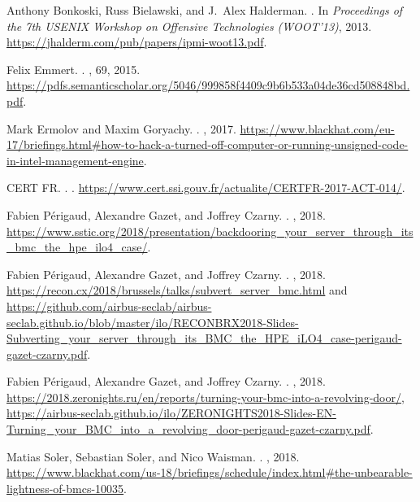 \begin{thebibliography}{1}

Anthony Bonkoski, Russ Bielawski, and J.~Alex Halderman.
.
\newblock In {\em {Proceedings of the 7th USENIX Workshop on Offensive
  Technologies (WOOT'13)}}, 2013.
\newblock \url{https://jhalderm.com/pub/papers/ipmi-woot13.pdf}.

Felix Emmert.
.
, 69, 2015.
\newblock
  \url{https://pdfs.semanticscholar.org/5046/999858f4409c9b6b533a04de36cd508848bd.pdf}.

Mark Ermolov and Maxim Goryachy.
.
, 2017.
\newblock
  \url{https://www.blackhat.com/eu-17/briefings.html#how-to-hack-a-turned-off-computer-or-running-unsigned-code-in-intel-management-engine}.

CERT FR.
.
.
\newblock \url{https://www.cert.ssi.gouv.fr/actualite/CERTFR-2017-ACT-014/}.

Fabien P{\'e}rigaud, Alexandre Gazet, and Joffrey Czarny.
.
, 2018.
\newblock
  \url{https://www.sstic.org/2018/presentation/backdooring_your_server_through_its_bmc_the_hpe_ilo4_case/}.

Fabien P{\'e}rigaud, Alexandre Gazet, and Joffrey Czarny.
.
, 2018.
\newblock \url{https://recon.cx/2018/brussels/talks/subvert_server_bmc.html}
  and
  \url{https://github.com/airbus-seclab/airbus-seclab.github.io/blob/master/ilo/RECONBRX2018-Slides-Subverting_your_server_through_its_BMC_the_HPE_iLO4_case-perigaud-gazet-czarny.pdf}.

Fabien P{\'e}rigaud, Alexandre Gazet, and Joffrey Czarny.
.
, 2018.
\newblock
  \url{https://2018.zeronights.ru/en/reports/turning-your-bmc-into-a-revolving-door/},
  \url{https://airbus-seclab.github.io/ilo/ZERONIGHTS2018-Slides-EN-Turning_your_BMC_into_a_revolving_door-perigaud-gazet-czarny.pdf}.

Matias Soler, Sebastian Soler, and Nico Waisman.
.
, 2018.
\newblock
  \url{https://www.blackhat.com/us-18/briefings/schedule/index.html#the-unbearable-lightness-of-bmcs-10035}.

\end{thebibliography}
